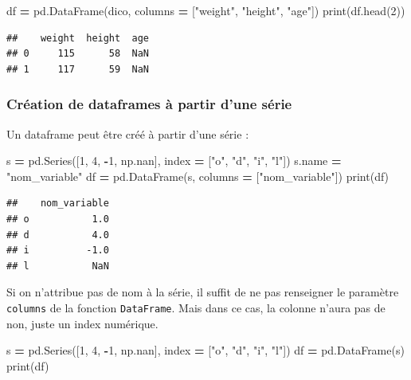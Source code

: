 \documentclass[12pt,]{book}
\newenvironment{Shaded}{\begin{snugshade}}{\end{snugshade}}
\newcommand{\DecValTok}[1]{\textcolor[rgb]{0.00,0.00,0.81}{#1}}
\newcommand{\StringTok}[1]{\textcolor[rgb]{0.31,0.60,0.02}{#1}}
\newcommand{\OperatorTok}[1]{\textcolor[rgb]{0.81,0.36,0.00}{\textbf{#1}}}
\newcommand{\BuiltInTok}[1]{#1}
\newcommand{\NormalTok}[1]{#1}
\numberwithin{equation}{section}
\numberwithin{countremarque}{section}
\begin{document}
\begin{Shaded}
\begin{Highlighting}[]
\NormalTok{df }\OperatorTok{=}\NormalTok{ pd.DataFrame(dico, columns }\OperatorTok{=}\NormalTok{ [}\StringTok{"weight"}\NormalTok{, }\StringTok{"height"}\NormalTok{, }\StringTok{"age"}\NormalTok{])}
\BuiltInTok{print}\NormalTok{(df.head(}\DecValTok{2}\NormalTok{))}
\end{Highlighting}
\end{Shaded}

\begin{lstlisting}
##    weight  height  age
## 0     115      58  NaN
## 1     117      59  NaN
\end{lstlisting}

\subsubsection{Création de dataframes à partir d'une
série}\label{creation-de-dataframes-a-partir-dune-serie}

Un dataframe peut être créé à partir d'une série :

\begin{Shaded}
\begin{Highlighting}[]
\NormalTok{s }\OperatorTok{=}\NormalTok{ pd.Series([}\DecValTok{1}\NormalTok{, }\DecValTok{4}\NormalTok{, }\OperatorTok{-}\DecValTok{1}\NormalTok{, np.nan], index }\OperatorTok{=}\NormalTok{ [}\StringTok{"o"}\NormalTok{, }\StringTok{"d"}\NormalTok{, }\StringTok{"i"}\NormalTok{, }\StringTok{"l"}\NormalTok{])}
\NormalTok{s.name }\OperatorTok{=} \StringTok{"nom_variable"}
\NormalTok{df }\OperatorTok{=}\NormalTok{ pd.DataFrame(s, columns }\OperatorTok{=}\NormalTok{ [}\StringTok{"nom_variable"}\NormalTok{])}
\BuiltInTok{print}\NormalTok{(df)}
\end{Highlighting}
\end{Shaded}

\begin{lstlisting}
##    nom_variable
## o           1.0
## d           4.0
## i          -1.0
## l           NaN
\end{lstlisting}

Si on n'attribue pas de nom à la série, il suffit de ne pas renseigner
le paramètre \texttt{columns} de la fonction \texttt{DataFrame}. Mais
dans ce cas, la colonne n'aura pas de non, juste un index numérique.

\begin{Shaded}
\begin{Highlighting}[]
\NormalTok{s }\OperatorTok{=}\NormalTok{ pd.Series([}\DecValTok{1}\NormalTok{, }\DecValTok{4}\NormalTok{, }\OperatorTok{-}\DecValTok{1}\NormalTok{, np.nan], index }\OperatorTok{=}\NormalTok{ [}\StringTok{"o"}\NormalTok{, }\StringTok{"d"}\NormalTok{, }\StringTok{"i"}\NormalTok{, }\StringTok{"l"}\NormalTok{])}
\NormalTok{df }\OperatorTok{=}\NormalTok{ pd.DataFrame(s)}
\BuiltInTok{print}\NormalTok{(df)}
\end{Highlighting}
\end{Shaded}
\end{document}
